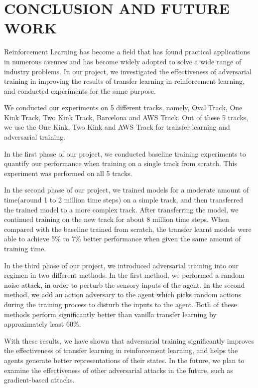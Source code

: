 
\chapter{CONCLUSION AND FUTURE WORK}

Reinforcement Learning has become a field that has found practical applications in numerous avenues and has become widely adopted to solve a wide range of industry problems. In our project, we investigated the effectiveness of adversarial training in improving the results of transfer learning in reinforcement learning, and conducted experiments for the same purpose.

We conducted our experiments on 5 different tracks, namely, Oval Track, One Kink Track, Two Kink Track, Barcelona and AWS Track. Out of these 5 tracks, we use the One Kink, Two Kink and AWS Track for transfer learning and adversarial training.

In the first phase of our project, we conducted baseline training experiments to quantify our performance when training on a single track from scratch. This experiment was performed on all 5 tracks.

In the second phase of our project, we trained models for a moderate amount of time(around 1 to 2 million time steps) on a simple track, and then transferred the trained model to a more complex track. After transferring the model, we continued training on the new track for about 8 million time steps. When compared with the baseline trained from scratch, the transfer learnt models were able to achieve 5\% to 7\% better performance when given the same amount of training time. 

In the third phase of our project, we introduced adversarial training into our regimen in two different methods. In the first method, we performed a random noise attack, in order to perturb the sensory inputs of the agent. In the second method, we add an action adversary to the agent which picks random actions during the training process to disturb the inputs to the agent. Both of these methods perform significantly better than vanilla transfer learning by approximately least 60\%.

With these results, we have shown that adversarial training significantly improves the effectiveness of transfer learning in reinforcement learning, and helps the agents generate better representations of their states. In the future, we plan to examine the effectiveness of other adversarial attacks in the future, such as gradient-based attacks. 
